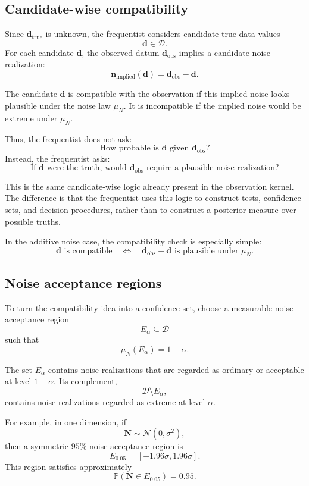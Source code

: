 \documentclass[11pt]{article}
\newcommand{\Dspace}{\mathcal D}
\newcommand{\muN}{\mu_N}
\newcommand{\Nrand}{\mathbf N}
\newcommand{\dtrue}{\mathbf d_{\mathrm{true}}}
\newcommand{\dobs}{\mathbf d_{\mathrm{obs}}}
\newcommand{\Ealpha}{E_{\alpha}}
\newcommand{\Prob}{\mathbb P}
\begin{document}
\subsection{Candidate-wise compatibility}

Since \(\dtrue\) is unknown, the frequentist considers candidate true data values
\[
    \mathbf d\in\Dspace.
\]
For each candidate \(\mathbf d\), the observed datum \(\dobs\) implies a candidate noise realization:
\[
    \mathbf n_{\mathrm{implied}}(\mathbf d)
    =
    \dobs-\mathbf d.
\]

The candidate \(\mathbf d\) is compatible with the observation if this implied noise looks plausible under the noise law \(\muN\). It is incompatible if the implied noise would be extreme under \(\muN\).

Thus, the frequentist does not ask:
\[
    \text{How probable is } \mathbf d \text{ given } \dobs?
\]
Instead, the frequentist asks:
\[
    \text{If } \mathbf d \text{ were the truth, would } \dobs
    \text{ require a plausible noise realization?}
\]

This is the same candidate-wise logic already present in the observation kernel. The difference is that the frequentist uses this logic to construct tests, confidence sets, and decision procedures, rather than to construct a posterior measure over possible truths.

In the additive noise case, the compatibility check is especially simple:
\[
    \mathbf d
    \text{ is compatible}
    \quad
    \Longleftrightarrow
    \quad
    \dobs-\mathbf d
    \text{ is plausible under } \muN.
\]

\subsection{Noise acceptance regions}

To turn the compatibility idea into a confidence set, choose a measurable noise acceptance region
\[
    \Ealpha\subseteq\Dspace
\]
such that
\[
    \muN(\Ealpha)=1-\alpha.
\]

The set \(\Ealpha\) contains noise realizations that are regarded as ordinary or acceptable at level \(1-\alpha\). Its complement,
\[
    \Dspace\setminus\Ealpha,
\]
contains noise realizations regarded as extreme at level \(\alpha\).

For example, in one dimension, if
\[
    \Nrand\sim\mathcal N(0,\sigma^2),
\]
then a symmetric \(95\%\) noise acceptance region is
\[
    E_{0.05}
    =
    [-1.96\sigma,1.96\sigma].
\]
This region satisfies approximately
\[
    \Prob(\Nrand\in E_{0.05})=0.95.
\]
\end{document}
